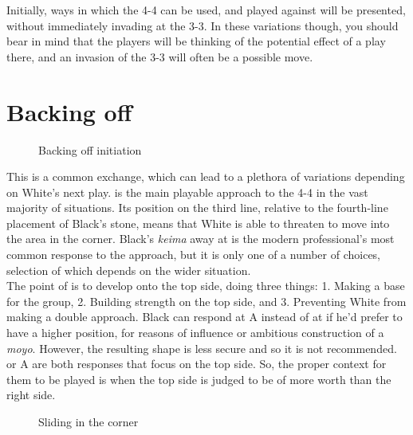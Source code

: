 \documentclass[a5paper,12pt,twoside]{book} %
\begin{document}
Initially, ways in which the 4-4 can be used, and played against will be presented, without immediately invading at the 3-3. In these variations though, you should bear in mind that the players will be thinking of the potential effect of a play there, and an invasion of the 3-3 will often be a possible move.\\

\section{Backing off}
\begin{figure}[!htbp]
 
\vspace{-0.6cm}\caption{Backing off initiation}
\label{4-4:backing-off-1}
\end{figure}

This is a common exchange, which can lead to a plethora of variations depending on White's next play.{\large\whitestone[1]} is the main playable approach to the 4-4 in the vast majority of situations. Its position on the third line, relative to the fourth-line placement of Black's stone, means that White is able to threaten to move into the area in the corner. Black's \textit{keima} away at{\large\blackstone[2]} is the modern professional's most common response to the approach, but it is only one of a number of choices, selection of which depends on the wider situation.\\

The point of{\large\blackstone[2]} is to develop onto the top side, doing three things: 1. Making a base for the group, 2. Building strength on the top side, and 3. Preventing White from making a double approach. Black can respond at A instead of at{\large\blackstone[2]} if he'd prefer to have a higher position, for reasons of influence or ambitious construction of a \textit{moyo}. However, the resulting shape is less secure and so it is not recommended.{\large\blackstone[2]} or A are both responses that focus on the top side. So, the proper context for them to be played is when the top side is judged to be of more worth than the right side.\\

\begin{figure}[!htbp]
 
\vspace{-0.6cm}\caption{Sliding in the corner}
\label{4-4:backing-off-2}
\end{figure}
\end{document}

